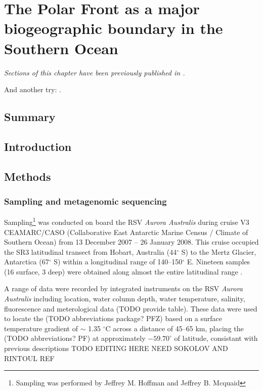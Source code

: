 \chapter{The Polar Front as a major biogeographic boundary in the Southern Ocean} 
\label{ch:polarfront}

\emph{Sections of this chapter have been previously published in .}

And another try: \cite{Wilkins:2012td}.

\section{Summary}

\section{Introduction}


\section{Methods}
\subsection{Sampling and metagenomic sequencing}

Sampling\footnote{Sampling was performed by Jeffrey M. Hoffman and Jeffrey B. Mcquaid} was conducted on board the RSV \emph{Aurora Australis} during cruise V3 CEAMARC/CASO (Collaborative East Antarctic Marine Census / Climate of Southern Ocean) from 13 December 2007 -- 26 January 2008. 
This cruise occupied the SR3 latitudinal transect from Hobart, Australia (44$^\circ$ S) to the Mertz Glacier, Antarctica (67$^\circ$ S) within a longitudinal range of 140--150$^\circ$ E.
Nineteen samples (16 surface, 3 deep) were obtained along almost the entire latitudinal range .



A range of data were recorded by integrated instruments on the RSV \emph{Aurora Australis} including location, water column depth, water temperature, salinity, fluorescence and meterological data (TODO provide table).
These data were used to locate the (TODO abbreviations package? PFZ) based on a surface temperature gradient of $\sim$ 1.35 $^\circ$C across a distance of 45--65 km, placing the (TODO abbreviations? PF) at approximately $-59.70^\circ$ of latitude, consistant with previous descriptions TODO EDITING HERE NEED SOKOLOV AND RINTOUL REF

